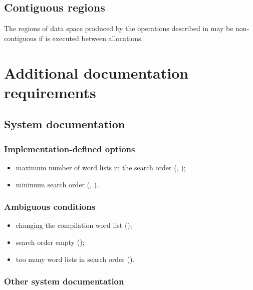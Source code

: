 \subsection{Contiguous regions} %

The regions of data space produced by the operations described in
 may be
non-contiguous if  is executed between allocations.

\section{Additional documentation requirements} %

\subsection{System documentation} %

\subsubsection{Implementation-defined options} %

\begin{itemize}
\item maximum number of word lists in the search order
	(,
	 );
\item minimum search order
	(,
	 ).
\end{itemize}

\subsubsection{Ambiguous conditions} %

\begin{itemize}
\item changing the compilation word list
	();
\item search order empty
	();
\item too many word lists in search order
	().
\end{itemize}

\subsubsection{Other system documentation} %

